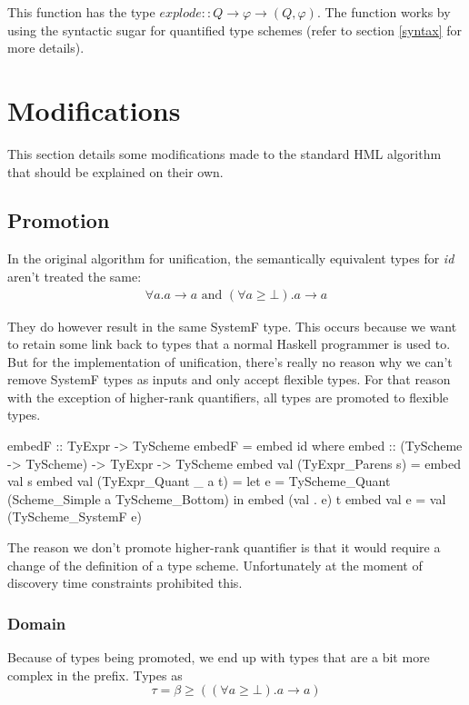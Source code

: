 This function has the type $explode :: Q \rightarrow \varphi \rightarrow (Q, \varphi)$. The function works by using the syntactic sugar for quantified type schemes (refer to section \ref{syntax} for more details).
\section{Modifications}
This section details some modifications made to the standard HML algorithm that should be explained on their own.
\subsection{Promotion}
In the original algorithm for unification, the semantically equivalent types for \emph{id} aren't treated the same:
\begin{eqnarray*}
\forall a. a \rightarrow a \textrm{ and }
(\forall a \geq \bot). a \rightarrow a
\end{eqnarray*}

They do however result in the same SystemF type. This occurs because we want to retain some link back to types that a normal Haskell programmer is used to. But for the implementation of unification, there's really no reason why we can't remove SystemF types as inputs and only accept flexible types. For that reason with the exception of higher-rank quantifiers, all types are promoted to flexible types.

\begin{code}
embedF :: TyExpr -> TyScheme
embedF = embed id
 where embed :: (TyScheme -> TyScheme) -> TyExpr -> TyScheme
       embed val (TyExpr_Parens     s) = embed val s
       embed val (TyExpr_Quant  _ a t) = 
         let e = TyScheme_Quant (Scheme_Simple a TyScheme_Bottom)
         in  embed (val . e) t
       embed val e                     = val (TyScheme_SystemF e)
\end{code}

The reason we don't promote higher-rank quantifier is that it would require a change of the definition of a type scheme. Unfortunately at the moment of discovery time constraints prohibited this.
\subsubsection{Domain}
Because of types being promoted, we end up with types that are a bit more complex in the prefix. Types as 
\begin{equation}
\tau = \beta \geq ((\forall a \geq \bot). a \rightarrow a)
\end{equation}

